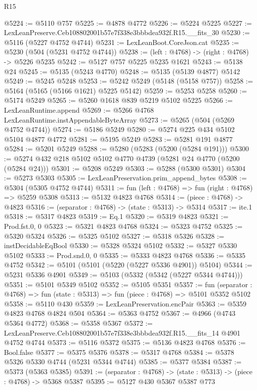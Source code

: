 \begin{lexlean}{R15}
\begin{coremodule}
{{{{{{{{{{{@5224 := @5110 @757
@5225 := @4878 @4772
@5226 := @5224 @5225
@5227 := LexLeanPreserve.Ceb108802001b57e7f338e3bbbdea932f.R15.__fits_30
@5230 := @5116 (@5227 @4752 @4744)
@5231 := LexLeanBoot.CoreJson.cat
@5235 := @5230 (@504 (@5231 @4752 @4744))
@5238 := (left : @4768) -> (right : @4768) -> @5226 @5235
@5242 := @5127 @757 @5225 @5235 @1621
@5243 := @5138 @24
@5245 := @5135 (@5243 @4770)
@5248 := @5135 (@5139 @4877) @5142
@5249 := @5245 @5248
@5253 := @5242 @5249 (@5148 (@5158 @757))
@5258 := @5164 (@5165 (@5166 @1621) @5225 @5142)
@5259 := @5253 @5258
@5260 := @5174 @5249
@5265 := @5260 @1618 @839 @5219 @5102 @5225
@5266 := LexLeanRuntime.append
@5269 := @5266 @4768 LexLeanRuntime.instAppendableByteArray
@5273 := @5265 (@504 (@5269 @4752 @4744))
@5274 := @5186 @5249
@5280 := @5274 @225 @434 @5102 @5104 @4877 @4772
@5281 := @5195 @5249
@5283 := @5281 @191 @4877
@5284 := @5201 @5249
@5288 := @5280 (@5283 (@5200 (@5284 @191)))
@5300 := @5274 @432 @218 @5102 @5102 @4770 @4739 (@5281 @24 @4770 (@5200 (@5284 @24)))
@5301 := @5208 @5249
@5303 := @5288 (@5300 @5301)
@5304 := @5273 @5303
@5305 := LexLeanPreservation.prim_append_bytes
@5308 := @5304 (@5305 @4752 @4744)
@5311 := fun (left : @4768) => fun (right : @4768) => @5259 @5308
@5313 := @5132 @4823 @4768
@5314 := (piece : @4768) -> @4823
@5316 := (separator : @4768) -> (state : @5313) -> @5314
@5317 := ite.{1}
@5318 := @5317 @4823
@5319 := Eq.{1}
@5320 := @5319 @4823
@5321 := Prod.fst.{0, 0}
@5323 := @5321 @4823 @4768
@5324 := @5323 @4752
@5325 := @5320 @5324
@5326 := @5325 @5102
@5327 := @5318 @5326
@5328 := instDecidableEqBool
@5330 := @5328 @5324 @5102
@5332 := @5327 @5330 @5102
@5333 := Prod.snd.{0, 0}
@5335 := @5333 @4823 @4768
@5336 := @5335 @4752
@5342 := @5101 (@5101 (@5220 (@5227 @5336 @4901)) @5104)
@5344 := @5231 @5336 @4901
@5349 := @5103 (@5332 (@5342 (@5227 @5344 @4744)))
@5351 := @5101 @5349 @5102
@5352 := @5105 @5351
@5357 := fun (separator : @4768) => fun (state : @5313) => fun (piece : @4768) => @5101 @5352 @5102
@5358 := @5110 @430
@5359 := LexLeanPreservation.encPair
@5363 := @5359 @4823 @4768 @4824 @504
@5364 := @5363 @4752
@5367 := @4966 (@4743 @5364 @4772)
@5368 := @5358 @5367
@5372 := LexLeanPreserve.Ceb108802001b57e7f338e3bbbdea932f.R15.__fits_14 @4901 @4752 @4744
@5373 := @5116 @5372
@5375 := @5136 @4823 @4768
@5376 := Bool.false
@5377 := @5375 @5376
@5378 := @5317 @4768
@5384 := @5378 @5326 @5330 @4744 (@5231 @5344 @4744)
@5385 := @5377 @5384
@5387 := @5373 (@5363 @5385)
@5391 := (separator : @4768) -> (state : @5313) -> (piece : @4768) -> @5368 @5387
@5395 := @5127 @430 @5367 @5387 @773
}}}}}}}}}}}
\end{coremodule}
\end{lexlean}
